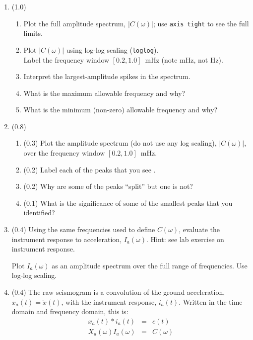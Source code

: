 \documentclass[11pt,titlepage,fleqn]{article}
\begin{document}
\begin{enumerate}
\item (1.0)
\begin{enumerate}
\item Plot the full amplitude spectrum, $|C(\omega)|$; use \verb+axis tight+ to see the full limits.
\item Plot $|C(\omega)|$ using log-log scaling (\verb+loglog+). \\
Label the frequency window $[0.2,1.0]$~mHz (note mHz, not Hz).
\item Interpret the largest-amplitude spikes in the spectrum.
\item What is the maximum allowable frequency and why?
\item What is the minimum (non-zero) allowable frequency and why?
\end{enumerate}


\item (0.8) 

\begin{enumerate}
\item (0.3) Plot the amplitude spectrum (do not use any log scaling), $|C(\omega)|$, over the frequency window $[0.2,1.0]$~mHz.
\item (0.2) Label each of the peaks that you see \citep[\eg][]{Park2005}.
\item (0.2) Why are some of the peaks ``split'' but one is not?
\item (0.1) What is the significance of some of the smallest peaks that you identified?
\end{enumerate}


\item (0.4) Using the same frequencies used to define $C(\omega)$, evaluate the instrument response to acceleration, $I_a(\omega)$. Hint: see lab exercise on instrument response.

Plot $I_a(\omega)$ as an amplitude spectrum over the full range of frequencies. Use log-log scaling.


\item (0.4) The raw seismogram is a convolution of the ground acceleration, $x_a(t) = \ddot{x}(t)$, with the instrument response, $i_a(t)$. Written in the time domain and frequency domain, this is:
%
\begin{eqnarray}
x_a(t) * i_a(t) &=& c(t)
\\
X_a(\omega) I_a(\omega) &=& C(\omega)
\end{eqnarray}


\end{enumerate}
\end{document}
